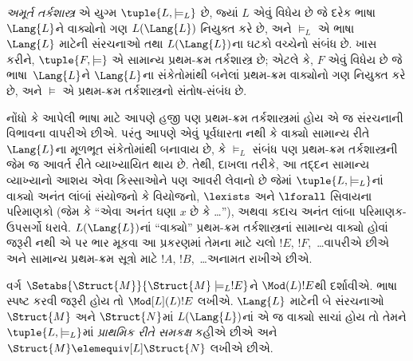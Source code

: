 \label{guunit:OLP-0205}


\begin{defn}
  \emph{અમૂર્ત તર્કશાસ્ત્ર} એ યુગ્મ $\tuple{L, \models_L}$ છે, જ્યાં
  $L$ એવું વિધેય છે જે દરેક ભાષા~$\Lang{L}$ને
  વાક્યોનો ગણ $L(\Lang{L})$ નિયુક્ત કરે છે, અને $\models_L$ એ
  ભાષા~$\Lang{L}$ માટેની સંરચનાઓ તથા $L(\Lang{L})$ના
  ઘટકો વચ્ચેનો સંબંધ છે. ખાસ કરીને, $\tuple{F, \models}$ એ
  સામાન્ય પ્રથમ-ક્રમ તર્કશાસ્ત્ર છે; એટલે કે, $F$ એવું વિધેય છે જે
  ભાષા~$\Lang{L}$ને $\Lang{L}$ના સંકેતોમાંથી બનેલાં પ્રથમ-ક્રમ
  વાક્યોનો ગણ નિયુક્ત કરે છે, અને $\models$ એ પ્રથમ-ક્રમ
  તર્કશાસ્ત્રનો સંતોષ-સંબંધ છે.
\end{defn}

નોંધો કે આપેલી ભાષા માટે આપણે હજી પણ પ્રથમ-ક્રમ તર્કશાસ્ત્રમાં
હોય એ જ સંરચનાની વિભાવના વાપરીએ છીએ. પરંતુ આપણે એવું પૂર્વધારતા
નથી કે વાક્યો સામાન્ય રીતે $\Lang{L}$ના મૂળભૂત સંકેતોમાંથી
બનાવાય છે, કે $\models_L$ સંબંધ પણ પ્રથમ-ક્રમ તર્કશાસ્ત્રની જેમ જ
આવર્ત રીતે વ્યાખ્યાયિત થાય છે. તેથી, દાખલા તરીકે, આ તદ્દન સામાન્ય
વ્યાખ્યાનો આશય એવા કિસ્સાઓને પણ આવરી લેવાનો છે જેમાં
$\tuple{L,\models_L}$નાં વાક્યો અનંત લાંબાં સંયોજનો કે વિયોજનો,
$\lexists$ અને $\lforall$ સિવાયના પરિમાણકો (જેમ કે ``એવા અનંત ઘણા
$x$ છે કે \dots''), અથવા કદાચ અનંત લાંબા પરિમાણક-ઉપસર્ગો ધરાવે.
$L(\Lang{L})$નાં ``વાક્યો'' પ્રથમ-ક્રમ તર્કશાસ્ત્રનાં સામાન્ય
વાક્યો હોવાં જરૂરી નથી એ પર ભાર મૂકવા આ પ્રકરણમાં તેમના માટે
ચલો $!E$, $!F$,~\dots વાપરીએ છીએ અને સામાન્ય પ્રથમ-ક્રમ
સૂત્રો માટે $!A$, $!B$,~\dots અનામત રાખીએ છીએ.

\begin{defn}
  વર્ગ $\Setabs{\Struct{M}}{\Struct{M} \models_L !E}$ને
  $\Mod(L){!E}$થી દર્શાવીએ. ભાષા સ્પષ્ટ કરવી જરૂરી હોય તો
  $\Mod[L](L){!E}$ લખીએ. $\Lang{L}$ માટેની બે સંરચનાઓ
  $\Struct{M}$ અને $\Struct{N}$માં $L(\Lang{L})$નાં એ જ
  વાક્યો સાચાં હોય તો તેમને $\tuple{L, \models_L}$માં
  \emph{પ્રાથમિક રીતે સમકક્ષ} કહીએ છીએ અને $\Struct{M}
  \elemequiv[L] \Struct{N}$ લખીએ છીએ.
\end{defn}

